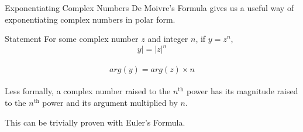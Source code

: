 \begin{namedframe}{Exponentiating Complex Numbers}
	De Moivre's Formula gives us a useful way of exponentiating complex numbers in polar form.
	\begin{block}{Statement}
		For some complex number $z$ and integer $n$, if $y = z^n$, \\ 
		\[y| = |z|^n\] \\
		\[arg(y) = arg(z) \times n\] \\
		Less formally, a complex number raised to the $n^{\text{th}}$ power has its magnitude
		raised to the $n^{\text{th}}$ power and its argument multiplied by $n$.
	\end{block}

	This can be trivially proven with Euler's Formula.
\end{namedframe}
